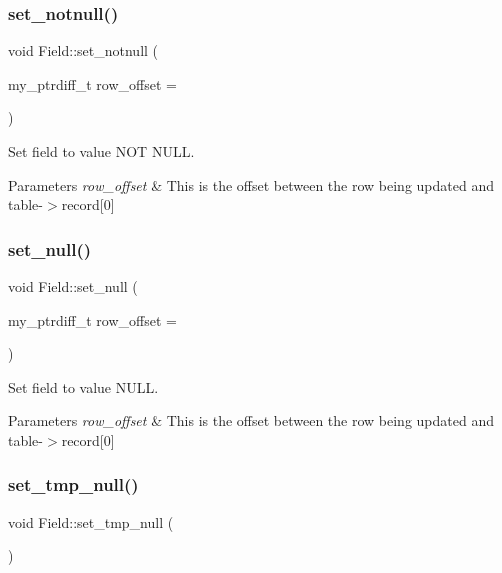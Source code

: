 \subsubsection{\texorpdfstring{set\+\_\+notnull()}{set\_notnull()}}
{\footnotesize\ttfamily void Field\+::set\+\_\+notnull (\begin{DoxyParamCaption}\item[{my\+\_\+ptrdiff\+\_\+t}]{row\+\_\+offset = {} }\end{DoxyParamCaption})}

Set field to value N\+OT N\+U\+LL.


\begin{DoxyParams}{Parameters}
{\em row\+\_\+offset} & This is the offset between the row being updated and table-\/$>$record\mbox{[}0\mbox{]} \\
\hline
\end{DoxyParams}
\mbox{\label{classField_acb9fc7a058facc0374fab4fb0391855c}} 
\subsubsection{\texorpdfstring{set\+\_\+null()}{set\_null()}}
{\footnotesize\ttfamily void Field\+::set\+\_\+null (\begin{DoxyParamCaption}\item[{my\+\_\+ptrdiff\+\_\+t}]{row\+\_\+offset = {} }\end{DoxyParamCaption})}

Set field to value N\+U\+LL.


\begin{DoxyParams}{Parameters}
{\em row\+\_\+offset} & This is the offset between the row being updated and table-\/$>$record\mbox{[}0\mbox{]} \\
\hline
\end{DoxyParams}
\mbox{\label{classField_a23c0718c0fe5c0cf2545c600e4c2dce9}} 
\subsubsection{\texorpdfstring{set\+\_\+tmp\+\_\+null()}{set\_tmp\_null()}}
{\footnotesize\ttfamily void Field\+::set\+\_\+tmp\+\_\+null (\begin{DoxyParamCaption}{ }\end{DoxyParamCaption})}

